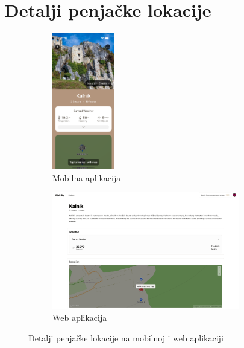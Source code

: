 \section{Detalji penjačke lokacije}

\begin{figure}[H]
    \centering
    \begin{subfigure}[b]{\textwidth}
        \centering
        \includegraphics[width=0.3\textwidth]{images/implementacija/crag-details/crag-details-top.png}
        \caption{Mobilna aplikacija}
        \label{fig:detalji_penjalista_mob}
    \end{subfigure}
    \hfill
    \begin{subfigure}[b]{\textwidth}
        \centering
        \includegraphics[width=0.9\textwidth]{images/implementacija/web/crag-details/crag-details-top.png}
        \caption{Web aplikacija}
        \label{fig:detalji_penjalista_web}
    \end{subfigure}
    \caption{Detalji penjačke lokacije na mobilnoj i web aplikaciji}
    \label{fig:detalji_penjališta_1}
\end{figure}

